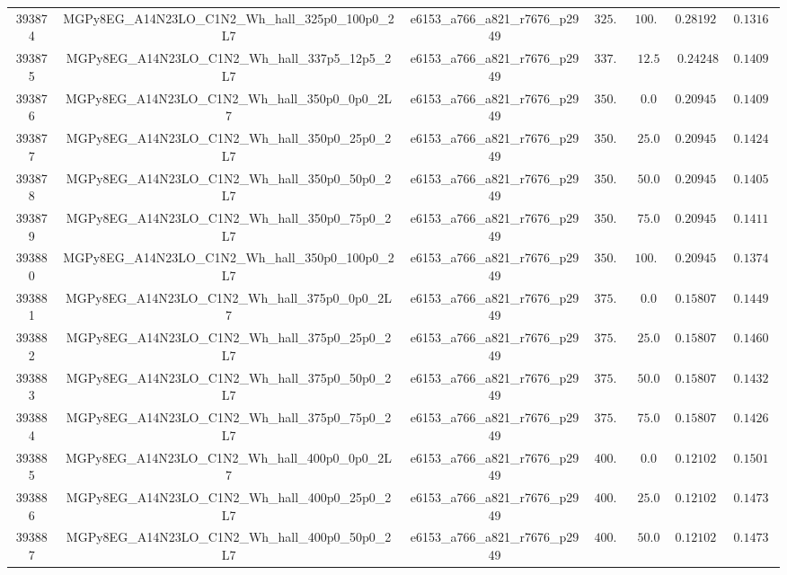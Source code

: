 \begin{table}[htbp]
\begin{center}
{\begin{tabular}{ccccccc}
393874 & MGPy8EG\_A14N23LO\_C1N2\_Wh\_hall\_325p0\_100p0\_2L7 & e6153\_a766\_a821\_r7676\_p2949 & $325.0$ & $100.0$ & $0.281924  $ & $0.13162$ \\
393875 & MGPy8EG\_A14N23LO\_C1N2\_Wh\_hall\_337p5\_12p5\_2L7  & e6153\_a766\_a821\_r7676\_p2949 & $337.5$ & $12.5 $ & $0.24248   $ & $0.14099$ \\
393876 & MGPy8EG\_A14N23LO\_C1N2\_Wh\_hall\_350p0\_0p0\_2L7   & e6153\_a766\_a821\_r7676\_p2949 & $350.0$ & $0.0  $ & $0.209458  $ & $0.14094$ \\
393877 & MGPy8EG\_A14N23LO\_C1N2\_Wh\_hall\_350p0\_25p0\_2L7  & e6153\_a766\_a821\_r7676\_p2949 & $350.0$ & $25.0 $ & $0.209458  $ & $0.14240$ \\
393878 & MGPy8EG\_A14N23LO\_C1N2\_Wh\_hall\_350p0\_50p0\_2L7  & e6153\_a766\_a821\_r7676\_p2949 & $350.0$ & $50.0 $ & $0.209458  $ & $0.14057$ \\
393879 & MGPy8EG\_A14N23LO\_C1N2\_Wh\_hall\_350p0\_75p0\_2L7  & e6153\_a766\_a821\_r7676\_p2949 & $350.0$ & $75.0 $ & $0.209458  $ & $0.14114$ \\
393880 & MGPy8EG\_A14N23LO\_C1N2\_Wh\_hall\_350p0\_100p0\_2L7 & e6153\_a766\_a821\_r7676\_p2949 & $350.0$ & $100.0$ & $0.209458  $ & $0.13746$ \\
393881 & MGPy8EG\_A14N23LO\_C1N2\_Wh\_hall\_375p0\_0p0\_2L7   & e6153\_a766\_a821\_r7676\_p2949 & $375.0$ & $0.0  $ & $0.158076  $ & $0.14497$ \\
393882 & MGPy8EG\_A14N23LO\_C1N2\_Wh\_hall\_375p0\_25p0\_2L7  & e6153\_a766\_a821\_r7676\_p2949 & $375.0$ & $25.0 $ & $0.158076  $ & $0.14609$ \\
393883 & MGPy8EG\_A14N23LO\_C1N2\_Wh\_hall\_375p0\_50p0\_2L7  & e6153\_a766\_a821\_r7676\_p2949 & $375.0$ & $50.0 $ & $0.158076  $ & $0.14322$ \\
393884 & MGPy8EG\_A14N23LO\_C1N2\_Wh\_hall\_375p0\_75p0\_2L7  & e6153\_a766\_a821\_r7676\_p2949 & $375.0$ & $75.0 $ & $0.158076  $ & $0.14262$ \\
393885 & MGPy8EG\_A14N23LO\_C1N2\_Wh\_hall\_400p0\_0p0\_2L7   & e6153\_a766\_a821\_r7676\_p2949 & $400.0$ & $0.0  $ & $0.121027  $ & $0.15012$ \\
393886 & MGPy8EG\_A14N23LO\_C1N2\_Wh\_hall\_400p0\_25p0\_2L7  & e6153\_a766\_a821\_r7676\_p2949 & $400.0$ & $25.0 $ & $0.121027  $ & $0.14731$ \\
393887 & MGPy8EG\_A14N23LO\_C1N2\_Wh\_hall\_400p0\_50p0\_2L7  & e6153\_a766\_a821\_r7676\_p2949 & $400.0$ & $50.0 $ & $0.121027  $ & $0.14735$ \\

\end{tabular}}
\end{center}
\end{table}
